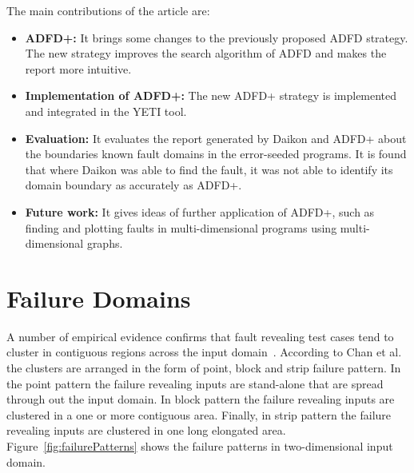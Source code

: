 \documentclass{acm_proc_article-sp}
\begin{document}
The main contributions of the article are:
\begin{itemize}
\item \textbf{ADFD+:} It brings some changes to the previously proposed ADFD strategy. The new strategy improves the search algorithm of ADFD and makes the report more intuitive.
\item \textbf{Implementation of ADFD+:} The new ADFD+ strategy is implemented and integrated in the YETI tool.
\item \textbf{Evaluation:} It evaluates the report generated by Daikon and ADFD+ about the boundaries known fault domains in the error-seeded programs. It is found that where Daikon was able to find the fault, it was not able to identify its domain boundary as accurately as ADFD+.
\item \textbf{Future work:} It gives ideas of further application of ADFD+, such as finding and plotting faults in multi-dimensional programs using multi-dimensional graphs. 
\end{itemize}




\section{Failure Domains}
A number of empirical evidence confirms that fault revealing test cases tend to cluster in contiguous regions across the input domain~\cite{white1980domain, finelli1991nasa, schneckenburger2007towards}. According to Chan et al.~\cite{chan1996proportional} the clusters are arranged in the form of point, block and strip failure pattern. In the point pattern the failure revealing inputs are stand-alone that are spread through out the input domain. In block pattern the failure revealing inputs are clustered in a one or more contiguous area. Finally, in strip pattern the failure revealing inputs are clustered in one long elongated area.  Figure~\ref{fig:failurePatterns} shows the failure patterns in two-dimensional input domain. 
\end{document}
